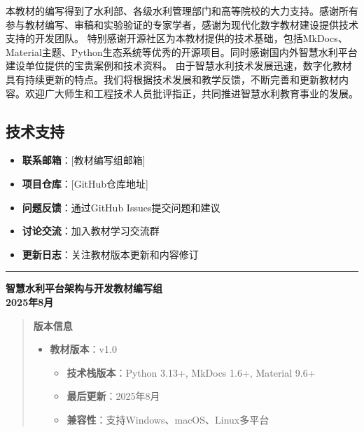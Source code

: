 本教材的编写得到了水利部、各级水利管理部门和高等院校的大力支持。感谢所有参与教材编写、审稿和实验验证的专家学者，感谢为现代化数字教材建设提供技术支持的开发团队。 特别感谢开源社区为本教材提供的技术基础，包括MkDocs、Material主题、Python生态系统等优秀的开源项目。同时感谢国内外智慧水利平台建设单位提供的宝贵案例和技术资料。 由于智慧水利技术发展迅速，数字化教材具有持续更新的特点。我们将根据技术发展和教学反馈，不断完善和更新教材内容。欢迎广大师生和工程技术人员批评指正，共同推进智慧水利教育事业的发展。 \subsection{技术支持}\label{ux6280ux672fux652fux6301} \begin{itemize} \item \textbf{ 联系邮箱}：{[}教材编写组邮箱{]} \item \textbf{ 项目仓库}：{[}GitHub仓库地址{]} \item \textbf{ 问题反馈}：通过GitHub Issues提交问题和建议 \item \textbf{ 讨论交流}：加入教材学习交流群 \item \textbf{ 更新日志}：关注教材版本更新和内容修订 \end{itemize} \begin{center}\rule{0.5\linewidth}{0.5pt}\end{center} \textbf{智慧水利平台架构与开发教材编写组}\\ \textbf{2025年8月} \begin{quote} \textbf{版本信息} \begin{itemize} \item \textbf{教材版本}：v1.0 \begin{itemize} \item \textbf{技术栈版本}：Python 3.13+, MkDocs 1.6+, Material 9.6+ \item \textbf{最后更新}：2025年8月 \item \textbf{兼容性}：支持Windows、macOS、Linux多平台 \end{itemize} \end{itemize} \end{quote}